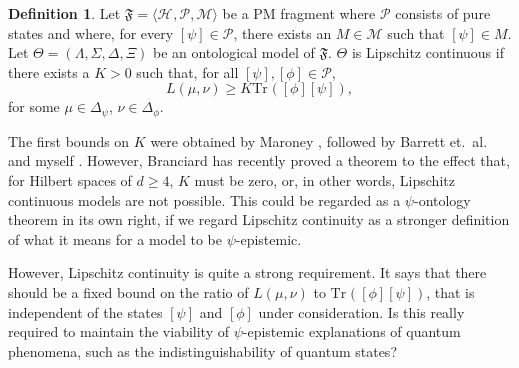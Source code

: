 \documentclass[DIV=calc,fontsize=12pt]{scrartcl} %
\theoremstyle{definition}
\newtheorem{definition}{Definition}[section]
\theoremstyle{plain}
\newcommand{\Proj}[1]{\ensuremath{\left [ #1 \right ]}}
\newcommand{\Hilb}[1][]{\ensuremath{\mathcal{H}_{#1}}}
\newcommand{\Tr}[2][]{\ensuremath{\text{Tr}_{#1} \left ( #2 \right )}}
\begin{document}
\begin{definition}
Let $\mathfrak{F} = \langle \Hilb, \mathcal{P}, \mathcal{M} \rangle$
be a PM fragment where $\mathcal{P}$ consists of pure states and
where, for every $\Proj{\psi} \in \mathcal{P}$, there exists an $M
\in \mathcal{M}$ such that $\Proj{\psi} \in M$.  Let $\Theta =
(\Lambda, \Sigma, \Delta, \Xi)$ be an ontological model of
$\mathfrak{F}$.  $\Theta$ is Lipschitz continuous if there exists a $K
> 0$ such that, for all $\Proj{\psi}, \Proj{\phi} \in \mathcal{P}$,
\begin{equation}
L(\mu,\nu) \geq K \Tr{\Proj{\phi}\Proj{\psi}},
\end{equation}
for some $\mu \in \Delta_{\psi}$, $\nu \in \Delta_{\phi}$.
\end{definition}

The first bounds on $K$ were obtained by Maroney \cite{Maroney2012},
followed by Barrett et.\ al.\ \cite{Barrett2013} and myself
\cite{Leifer2014}.  However, Branciard \cite{Branciard2014} has
recently proved a theorem to the effect that, for Hilbert spaces of $d
\geq 4$, $K$ must be zero, or, in other words, Lipschitz continuous
models are not possible.  This could be regarded as a $\psi$-ontology
theorem in its own right, if we regard Lipschitz continuity as a
stronger definition of what it means for a model to be
$\psi$-epistemic.

However, Lipschitz continuity is quite a strong requirement.  It says
that there should be a fixed bound on the ratio of $L(\mu,\nu)$ to
$\Tr{\Proj{\phi}\Proj{\psi}}$, that is independent of the states
$\Proj{\psi}$ and $\Proj{\phi}$ under consideration.  Is this really
required to maintain the viability of $\psi$-epistemic explanations of
quantum phenomena, such as the indistinguishability of quantum states?
\end{document}
